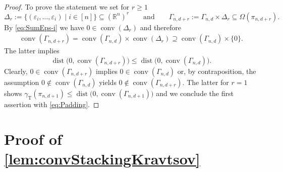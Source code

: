 \documentclass[10pt,a4paper]{article}
\numberwithin{equation}{section}
\DeclareMathOperator{\T}{T}
\DeclareMathOperator{\conv}{conv}
\DeclareMathOperator{\dist}{dist}
\newcommand{\RR}{\mathbb R}
\newcommand{\eps}{\varepsilon}
\begin{document}
\begin{proof}
To prove the statement we set for $r \geq 1 $
	\[ \Delta_r := \{ (\eps_i,\ldots,\eps_i) \mid i \in [n] \} \subseteq (\RR^n)^r \qquad \text{and} \qquad
	\Gamma_{n,d+r} := \Gamma_{n,d} \times \Delta_r \subseteq \Omega(\pi_{n,d+r}) . \]
By \cref{eq:SumEps-i} we have $0 \in \conv(\Delta_r)$ and therefore
	\begin{align*}
	\conv(\Gamma_{n,d+r}) = \conv(\Gamma_{n,d}) \times \conv(\Delta_r)
	\supseteq \conv(\Gamma_{n,d}) \times \{0\}.
	\end{align*}
The latter implies
	\begin{equation}\label{eq:Padding}
	\dist \big( 0, \conv(\Gamma_{n,d+r}) \big) \leq \dist \big( 0, \conv(\Gamma_{n,d}) \big).
	\end{equation}
Clearly, $0 \in \conv(\Gamma_{n,d+r})$ implies $0 \in \conv(\Gamma_{n,d})$ or, by contraposition, the assumption $0 \notin \conv(\Gamma_{n,d})$ yields $0 \notin \conv(\Gamma_{n,d+r})$. The latter for $r=1$ shows $\gamma_{\T}(\pi_{n,d+1}) \leq \dist \big(0, \conv(\Gamma_{n,d + 1}) \big)$ and we conclude the first assertion with \cref{eq:Padding}.
\end{proof}

\setcounter{section}{3}\section{Proof of \cref{lem:convStackingKravtsov}}\label{sec:StackingKravtsovGeneral}
\end{document}
